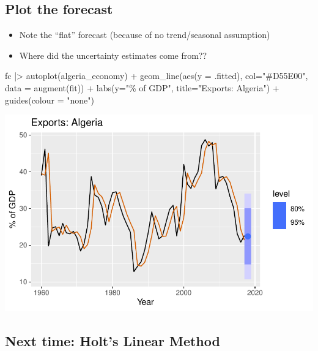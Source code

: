 \documentclass[
  letterpaper,
  DIV=11,
  numbers=noendperiod]{scrartcl}
\newenvironment{Shaded}{\begin{snugshade}}{\end{snugshade}}
\newcommand{\AttributeTok}[1]{\textcolor[rgb]{0.40,0.45,0.13}{#1}}
\newcommand{\FunctionTok}[1]{\textcolor[rgb]{0.28,0.35,0.67}{#1}}
\newcommand{\NormalTok}[1]{\textcolor[rgb]{0.00,0.23,0.31}{#1}}
\newcommand{\SpecialCharTok}[1]{\textcolor[rgb]{0.37,0.37,0.37}{#1}}
\newcommand{\StringTok}[1]{\textcolor[rgb]{0.13,0.47,0.30}{#1}}
\begin{document}
\subsection{Plot the forecast}\label{plot-the-forecast}

\begin{itemize}
\item
  Note the ``flat'' forecast (because of no trend/seasonal assumption)
\item
  Where did the uncertainty estimates come from??
\end{itemize}

\begin{Shaded}
\begin{Highlighting}[]
\NormalTok{fc }\SpecialCharTok{|\textgreater{}}
  \FunctionTok{autoplot}\NormalTok{(algeria\_economy) }\SpecialCharTok{+}
  \FunctionTok{geom\_line}\NormalTok{(}\FunctionTok{aes}\NormalTok{(}\AttributeTok{y =}\NormalTok{ .fitted), }\AttributeTok{col=}\StringTok{"\#D55E00"}\NormalTok{,}
            \AttributeTok{data =} \FunctionTok{augment}\NormalTok{(fit)) }\SpecialCharTok{+}
  \FunctionTok{labs}\NormalTok{(}\AttributeTok{y=}\StringTok{"\% of GDP"}\NormalTok{, }\AttributeTok{title=}\StringTok{"Exports: Algeria"}\NormalTok{) }\SpecialCharTok{+}
  \FunctionTok{guides}\NormalTok{(}\AttributeTok{colour =} \StringTok{"none"}\NormalTok{)}
\end{Highlighting}
\end{Shaded}

\includegraphics{Lecture12_files/figure-pdf/unnamed-chunk-17-1.pdf}

\subsection{Next time: Holt's Linear
Method}\label{next-time-holts-linear-method}
\end{document}
